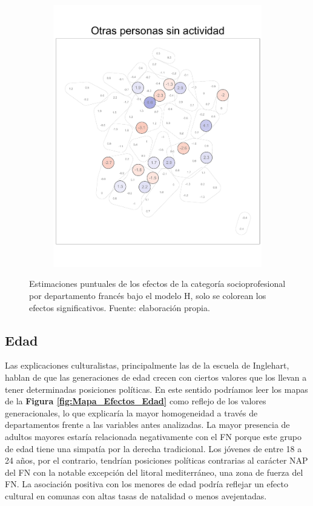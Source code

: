 \begin{figure}
\begin{subfigure}{0.235\textwidth}
	\includegraphics[width = \textwidth]{Figs/Efectos/Dorling_Efectos_CSP8_Modelo_H}
	\end{subfigure}
	\caption{Estimaciones puntuales de los efectos de la categoría socioprofesional por departamento francés bajo el modelo H, solo se colorean los efectos significativos. Fuente: elaboración propia.}
	\label{fig:Dorling_Efectos_Cat_Socioprof}
\end{figure}


\subsection{Edad}

Las explicaciones culturalistas, principalmente las de la escuela de Inglehart, hablan de que las generaciones de edad crecen con ciertos valores que los llevan a tener determinadas posiciones políticas. En este sentido podríamos leer los mapas de la \textbf{Figura \ref{fig:Mapa_Efectos_Edad}} como reflejo de los valores generacionales, lo que explicaría la mayor homogeneidad a través de departamentos frente a las variables antes analizadas. La mayor presencia de adultos mayores estaría relacionada negativamente con el FN porque este grupo de edad tiene una simpatía por la derecha tradicional. Los jóvenes de entre 18 a 24 años, por el contrario, tendrían posiciones políticas contrarias al carácter NAP del FN con la notable excepción del litoral mediterráneo, una zona de fuerza del FN. La asociación positiva con los menores de edad podría reflejar un efecto cultural en comunas con altas tasas de natalidad o menos avejentadas.\\

